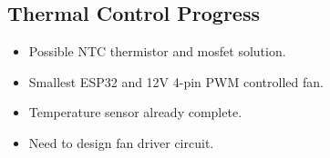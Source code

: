 \documentclass[11pt,a4paper]{article}
\begin{document}
	\subsection{Thermal Control Progress}
	\begin{itemize}
		\item Possible NTC thermistor and mosfet solution.
		\item Smallest ESP32 and 12V 4-pin PWM controlled fan.
		\item Temperature sensor already complete.
		\item Need to design fan driver circuit.
	\end{itemize}
	
	
	
	
\end{document}

